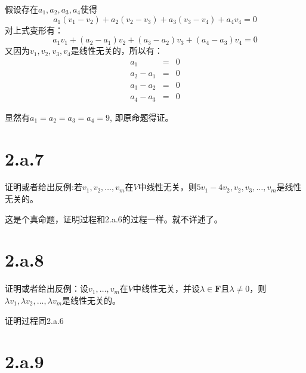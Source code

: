 \documentclass[10pt,a4paper,UTF8]{article}
\begin{document}
\begin{answer}
假设存在\(a_{1},a_{2},a_{3},a_{4}\)使得
\begin{equation}
\label{eq:5}
a_{1}(v_{1}-v_{2}) + a_{2}(v_{2} - v_{3}) + a_{3}(v_{3}-v_{4}) + a_{4}v_{4} =0
\end{equation}
对上式变形有：
\begin{equation}
\label{eq:6}
a_{1}v_{1} + (a_{2}-a_{1})v_{2} + (a_{3}-a_{2})v_{3} + (a_{4}-a_{3})v_{4} = 0
\end{equation}
又因为\(v_{1},v_{2},v_{3},v_{4}\)是线性无关的，所以有：
\begin{eqnarray*}
a_{1}&=&0 \\
a_{2} - a_{1} &=&0 \\
a_{3} -a_{2} &=&0 \\
a_{4} - a_{3} &=& 0
\end{eqnarray*}

显然有\(a_{1}=a_{2}=a_{3}=a_{4}=9\), 即原命题得证。
\end{answer}
\section*{2.a.7}
\label{sec:orgf459151}



\begin{problem}
证明或者给出反例:若\(v_{1},v_{2},\ldots ,v_{m}\)在\(V\)中线性无关，则\(5v_{1}-4v_{2},v_{2},v_{3},\ldots ,v_{m}\)是线性无关的。
\end{problem}

\begin{answer}
这是个真命题，证明过程和2.a.6的过程一样。就不详述了。
\end{answer}
\section*{2.a.8}
\label{sec:orgc27fa71}


\begin{problem}
证明或者给出反例：设\(v_{1},\ldots ,v_{m}\)在\(V\)中线性无关，并设\(\lambda \in \mathbf{F}\)且\(\lambda \neq 0\)，则\(\lambda v_{1},\lambda v_{2},\ldots ,\lambda v_{m}\)是线性无关的。
\end{problem}

\begin{answer}
证明过程同2.a.6
\end{answer}

\section*{2.a.9}
\label{sec:org2c5559f}
\end{document}
